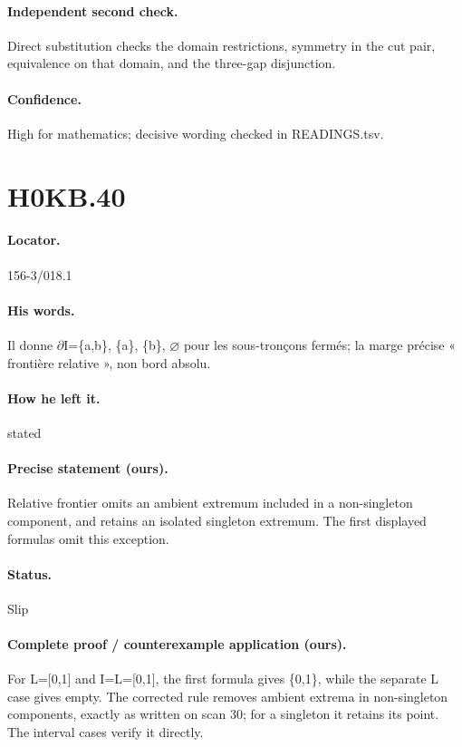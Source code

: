 \paragraph{Independent second check.} Direct substitution checks the domain restrictions, symmetry in the cut pair, equivalence on that domain, and the three-gap disjunction.

\paragraph{Confidence.} High for mathematics; decisive wording checked in READINGS.tsv.

\section*{H0KB.40}\label{statement:H0KB.40}
\paragraph{Locator.} 156-3/018.1

\paragraph{His words.} Il donne \ensuremath{\partial}I=\{a,b\}, \{a\}, \{b\}, \ensuremath{\varnothing} pour les sous-tronçons fermés; la marge précise « frontière relative », non bord absolu.

\paragraph{How he left it.} stated

\paragraph{Precise statement (ours).} Relative frontier omits an ambient extremum included in a non-singleton component, and retains an isolated singleton extremum. The first displayed formulas omit this exception.

\paragraph{Status.} Slip

\paragraph{Complete proof / counterexample application (ours).} For L=[0,1] and I=L=[0,1], the first formula gives \{0,1\}, while the separate L case gives empty. The corrected rule removes ambient extrema in non-singleton components, exactly as written on scan 30; for a singleton it retains its point. The interval cases verify it directly.

